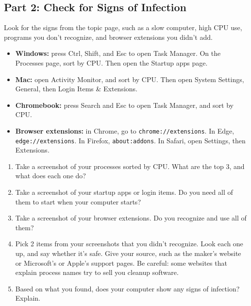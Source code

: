 \documentclass[12pt]{article}
\begin{document}
\subsection*{Part 2: Check for Signs of Infection}
Look for the signs from the topic page, such as a slow computer, high CPU use, programs you don't recognize, and browser extensions you didn't add.
\begin{itemize}
    \item \textbf{Windows:} press Ctrl, Shift, and Esc to open Task Manager. On the Processes page, sort by CPU. Then open the Startup apps page.
    \item \textbf{Mac:} open Activity Monitor, and sort by CPU. Then open System Settings, General, then Login Items \& Extensions.
    \item \textbf{Chromebook:} press Search and Esc to open Task Manager, and sort by CPU.
    \item \textbf{Browser extensions:} in Chrome, go to \texttt{chrome://extensions}. In Edge, \texttt{edge://extensions}. In Firefox, \texttt{about:addons}. In Safari, open Settings, then Extensions.
\end{itemize}
\begin{enumerate}[start=5]
    \item Take a screenshot of your processes sorted by CPU. What are the top 3, and what does each one do?
    \item Take a screenshot of your startup apps or login items. Do you need all of them to start when your computer starts?
    \item Take a screenshot of your browser extensions. Do you recognize and use all of them?
    \item Pick 2 items from your screenshots that you didn't recognize. Look each one up, and say whether it's safe. Give your source, such as the maker's website or Microsoft's or Apple's support pages. Be careful: some websites that explain process names try to sell you cleanup software.
    \item Based on what you found, does your computer show any signs of infection? Explain.
\end{enumerate}
\end{document}

